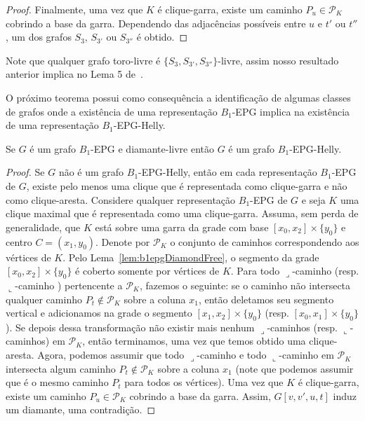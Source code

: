 \begin{proof}
 Finalmente,   uma vez que $K$ é clique-garra,  existe um caminho $P_u \in \mathcal{P}_K$ cobrindo a base da garra. Dependendo das adjacências possíveis entre  $u$ e $t'$ ou   $t''$, um dos grafos  $S_{3}$, $S_{3'}$ ou $S_{3''}$ é obtido.
\end{proof}




Note  que qualquer grafo toro-livre é $\{S_{3}, S_{3'}, S_{3''}\}$-livre, assim nosso resultado anterior implica no Lema 5 de~\cite{ries2009}.






O próximo teorema possui como consequência a identificação de algumas classes de grafos onde a existência de uma  representação $B_1$-EPG implica na existência de uma representação  $B_1$-EPG-Helly.


\begin{theorem} \label{lem:b1DiamondFree}
 Se $G$ é um grafo $B_1$-EPG e diamante-livre então $G$ é um grafo $B_1$-EPG-Helly.
 \end{theorem}

\begin{proof}
Se $G$ não é um grafo $B_1$-EPG-Helly, então em cada representação $B_1$-EPG de $G$, existe pelo menos uma clique que é representada como clique-garra e não como clique-aresta.  Considere qualquer representação $B_1$-EPG de $G$  e seja $K$ uma clique maximal que é representada como uma clique-garra. Assuma, sem perda de generalidade, que $K$ está sobre uma garra da grade com base $[x_0, x_2]\times\{y_0\}$ e centro $C = (x_1, y_0)$. Denote por  $\mathcal{P}_K$ o conjunto de caminhos correspondendo aos vértices de $K$. 
 Pelo Lema~\ref{lem:b1epgDiamondFree},  %
o segmento da grade $[x_0, x_2]\times\{y_0\}$ é coberto somente por vértices de $K$. %
 Para todo  ${\displaystyle \lrcorner}$-caminho %
 (resp. ${\displaystyle \llcorner}$-caminho 
 ) pertencente a  $\mathcal{P}_K$, fazemos o seguinte: se %
 o caminho não intersecta qualquer caminho $P_t \notin\mathcal{P}_K$ sobre a coluna $x_1$, então deletamos seu segmento vertical e adicionamos na grade o segmento $[x_1, x_2]\times\{y_0\}$ (resp. $[x_0, x_1]\times\{y_0\}$). Se depois dessa transformação não existir mais nenhum ${\displaystyle \lrcorner}$-caminhos (resp. ${\displaystyle \llcorner}$-caminhos) em $\mathcal{P}_K$, então terminamos, uma vez que temos obtido uma clique-aresta. Agora, podemos assumir que todo  ${\displaystyle \lrcorner}$-caminho   e todo ${\displaystyle \llcorner}$-caminho em $ \mathcal{P}_K$ intersecta algum caminho $P_t \notin \mathcal{P}_K$   sobre a coluna $x_1$ (note que podemos assumir que é o mesmo caminho $P_t$ para todos os vértices). Uma vez que $K$ é clique-garra, existe um caminho $P_u \in \mathcal{P}_K$ cobrindo a base da garra. Assim, $G[v, v', u, t]$ induz um diamante, uma contradição.
\end{proof}  


